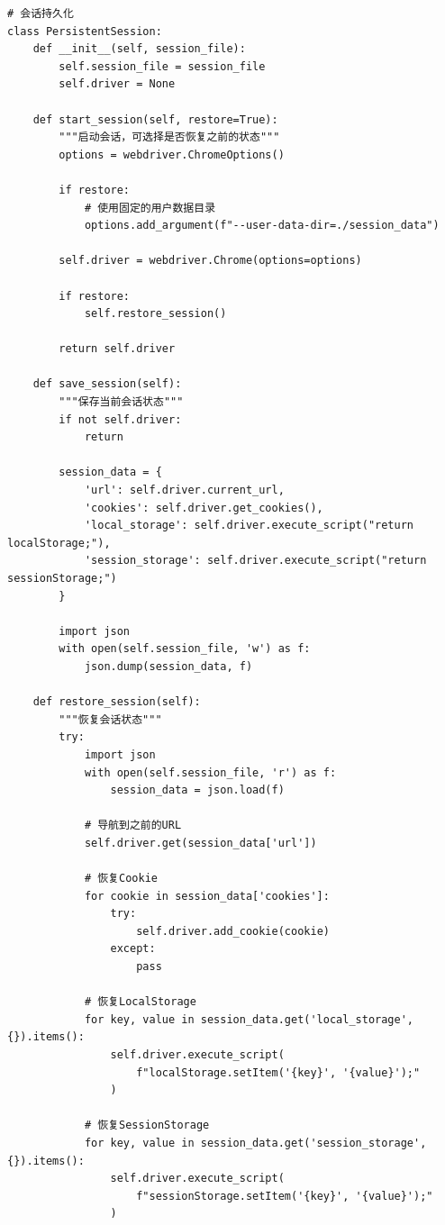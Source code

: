 \begin{lstlisting}[style=demostyle,numbers=none]
# 会话持久化
class PersistentSession:
    def __init__(self, session_file):
        self.session_file = session_file
        self.driver = None
    
    def start_session(self, restore=True):
        """启动会话，可选择是否恢复之前的状态"""
        options = webdriver.ChromeOptions()
        
        if restore:
            # 使用固定的用户数据目录
            options.add_argument(f"--user-data-dir=./session_data")
        
        self.driver = webdriver.Chrome(options=options)
        
        if restore:
            self.restore_session()
        
        return self.driver
    
    def save_session(self):
        """保存当前会话状态"""
        if not self.driver:
            return
        
        session_data = {
            'url': self.driver.current_url,
            'cookies': self.driver.get_cookies(),
            'local_storage': self.driver.execute_script("return localStorage;"),
            'session_storage': self.driver.execute_script("return sessionStorage;")
        }
        
        import json
        with open(self.session_file, 'w') as f:
            json.dump(session_data, f)
    
    def restore_session(self):
        """恢复会话状态"""
        try:
            import json
            with open(self.session_file, 'r') as f:
                session_data = json.load(f)
            
            # 导航到之前的URL
            self.driver.get(session_data['url'])
            
            # 恢复Cookie
            for cookie in session_data['cookies']:
                try:
                    self.driver.add_cookie(cookie)
                except:
                    pass
            
            # 恢复LocalStorage
            for key, value in session_data.get('local_storage', {}).items():
                self.driver.execute_script(
                    f"localStorage.setItem('{key}', '{value}');"
                )
            
            # 恢复SessionStorage
            for key, value in session_data.get('session_storage', {}).items():
                self.driver.execute_script(
                    f"sessionStorage.setItem('{key}', '{value}');"
                )
            

\end{lstlisting}

